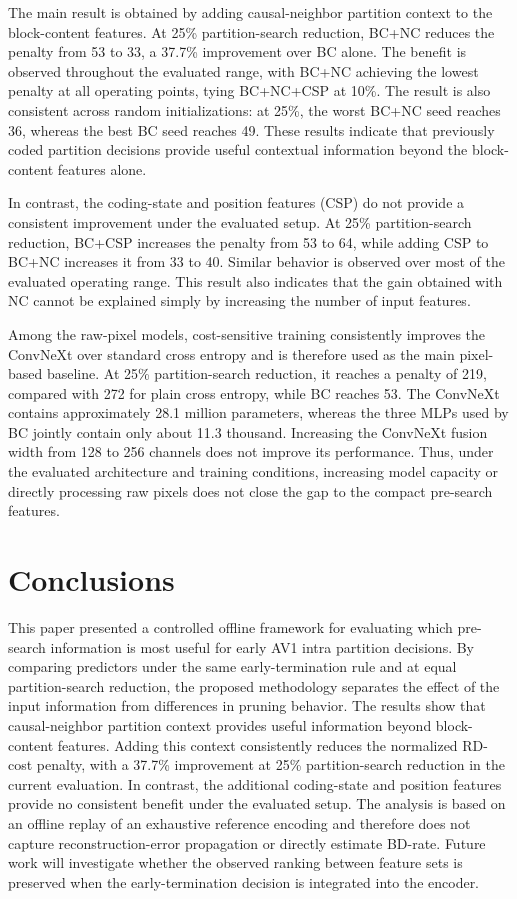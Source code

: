 \documentclass{article}
\begin{document}
The main result is obtained by adding causal-neighbor partition context to the block-content features. At 25\% partition-search reduction, BC+NC reduces the penalty from 53 to 33, a 37.7\% improvement over BC alone. The benefit is observed throughout the evaluated range, with BC+NC achieving the lowest penalty at all operating points, tying BC+NC+CSP at 10\%. The result is also consistent across random initializations: at 25\%, the worst BC+NC seed reaches 36, whereas the best BC seed reaches 49. These results indicate that previously coded partition decisions provide useful contextual information beyond the block-content features alone.

In contrast, the coding-state and position features (CSP) do not provide
a consistent improvement under the evaluated setup. At 25\% partition-search reduction, BC+CSP increases the penalty from 53 to 64, while adding CSP to BC+NC increases it from 33 to 40. Similar behavior is observed over most of the evaluated operating range. This result also indicates that the gain obtained with NC cannot be explained simply by increasing the number of input features.

Among the raw-pixel models, cost-sensitive training consistently improves the ConvNeXt over standard cross entropy and is therefore used as the main pixel-based baseline. At 25\% partition-search reduction, it reaches a penalty of 219, compared with 272 for plain cross entropy, while BC reaches 53. The ConvNeXt contains approximately 28.1 million parameters, whereas the three MLPs used by BC jointly contain only about 11.3 thousand. Increasing the ConvNeXt fusion width from 128 to 256 channels does not improve its performance. Thus, under the evaluated architecture and training conditions, increasing model capacity or directly processing raw pixels does not close the gap to the compact pre-search features.



\section{Conclusions}
\label{sec:conclusions}

This paper presented a controlled offline framework for evaluating which pre-search information is most useful for early AV1 intra partition decisions. By comparing predictors under the same early-termination rule and at equal partition-search reduction, the proposed methodology separates the effect of the input information from differences in pruning behavior.
The results show that causal-neighbor partition context provides useful information beyond block-content features. 
Adding this context consistently reduces the normalized RD-cost penalty, with a 37.7\% improvement at 25\% partition-search reduction in the current evaluation. In contrast, the additional coding-state and position features provide no consistent benefit under the evaluated setup.
The analysis is based on an offline replay of an exhaustive reference encoding and therefore does not capture reconstruction-error propagation or directly estimate BD-rate. Future work will investigate whether the observed ranking between feature sets is preserved when the early-termination decision is integrated into the encoder.
\end{document}
